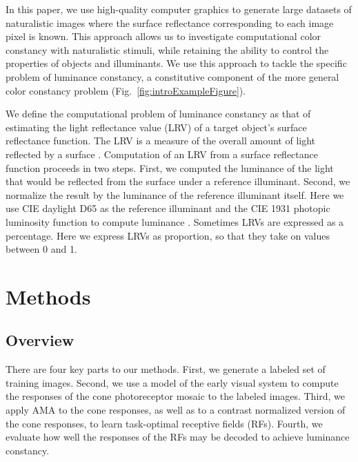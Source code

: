 \documentclass{jov}
\begin{document}
In this paper, we use high-quality computer graphics to generate large datasets of naturalistic images where the surface reflectance corresponding to each image pixel is known. 
This approach allows us to investigate computational color constancy with naturalistic stimuli, while retaining the ability to control the properties of objects and illuminants. We use this approach to tackle the specific problem of luminance constancy, a constitutive component of the more general color constancy problem (Fig.~\ref{fig:introExampleFigure}). 

We define the computational problem of luminance constancy as that of estimating the light reflectance value (LRV) of a target object's surface reflectance function.
The LRV is a measure of the overall amount of light reflected by a surface \cite{astm1121477}.
Computation of an LRV from a surface reflectance function proceeds in two steps.
First, we computed the luminance of the light that would be reflected from the surface under a reference illuminant.
Second, we normalize the result by the luminance of the reference illuminant itself.
Here we use CIE daylight D65 as the reference illuminant and the CIE 1931 photopic luminosity function to compute luminance \cite{CIE86}.
Sometimes LRVs are expressed as a percentage.
Here we express LRVs as proportion, so that they take on values between 0 and 1.

\section*{Methods} \label{Methods}
\subsection{Overview}
There are four key parts to our methods.  First, we generate a labeled set of training images.  Second, we use a model of the early visual system to compute the responses of the cone photoreceptor mosaic to the labeled images. Third, we apply AMA to the cone responses, as well as to a contrast normalized version of the cone responses, to learn task-optimal receptive fields (RFs). Fourth, we evaluate how well the responses of the RFs may be decoded to achieve luminance constancy.
\end{document}
